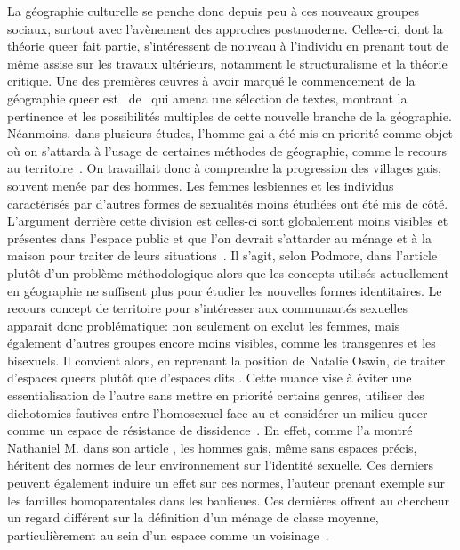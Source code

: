La géographie culturelle se penche donc depuis peu à ces nouveaux groupes sociaux, surtout avec l'avènement des approches postmoderne.
Celles-ci, dont la théorie queer fait partie, s'intéressent de nouveau à l'individu en prenant tout de même assise sur les travaux ultérieurs, notamment le structuralisme et la théorie critique.
Une des premières œuvres à avoir marqué le commencement de la géographie queer est~ de~\citet{Bell1994} qui amena une sélection de textes, montrant la pertinence et les possibilités multiples de cette nouvelle branche de la géographie.
Néanmoins, dans plusieurs études, l'homme gai a été mis en priorité comme objet où on s'attarda à l'usage de certaines méthodes de géographie, comme le recours au territoire~\citep{Podmore2001,Oswin2008}.
On travaillait donc à comprendre la progression des villages gais, souvent menée par des hommes.
Les femmes lesbiennes et les individus caractérisés par d'autres formes de sexualités moins étudiées ont été mis de côté.
L'argument derrière cette division est celles-ci sont globalement moins visibles et présentes dans l'espace public et que l'on devrait s'attarder au ménage et à la maison pour traiter de leurs situations~\citep[333-334]{Podmore2001}.
Il s'agit, selon Podmore, dans l'article  plutôt d'un problème méthodologique alors que les concepts utilisés actuellement en géographie ne suffisent plus pour étudier les nouvelles formes identitaires.
Le recours concept de territoire  pour s'intéresser aux communautés sexuelles apparait donc problématique: non seulement on exclut les femmes, mais également d'autres groupes encore moins visibles, comme les transgenres et les bisexuels.
Il convient alors, en reprenant la position de Natalie Oswin, de traiter d'espaces queers plutôt que d'espaces dits \lgbt.
Cette nuance vise à éviter une essentialisation de l'autre sans mettre en priorité certains genres, utiliser des dichotomies fautives entre l'homosexuel face au  et considérer  un milieu queer comme un espace de résistance de dissidence~\citep{Oswin2008}.
En effet, comme l'a montré Nathaniel M. \citet{Lewis2011} dans son article , les hommes gais, même sans espaces précis, héritent des normes de leur environnement sur l'identité sexuelle.
Ces derniers peuvent également induire un effet sur ces normes, l'auteur prenant exemple sur les familles homoparentales dans les banlieues.
Ces dernières offrent au chercheur un regard différent sur la définition d'un ménage de classe moyenne, particulièrement au sein d'un espace comme un voisinage~\citep[304]{Lewis2011}.

